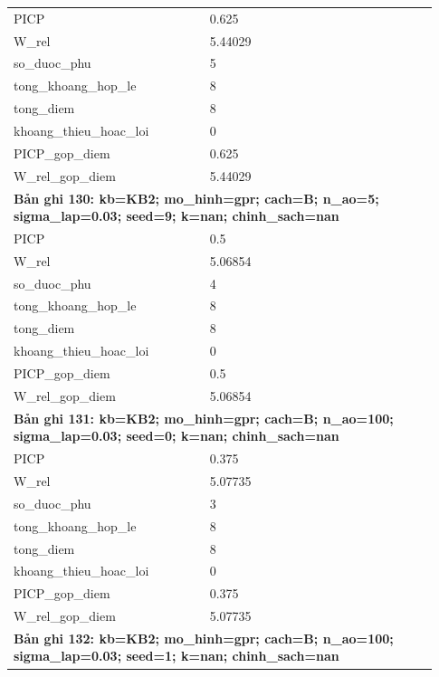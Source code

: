 \begin{longtable}{p{0.43\linewidth}p{0.50\linewidth}}
PICP & 0.625 \\
W\_\allowbreak rel & 5.44029 \\
so\_\allowbreak duoc\_\allowbreak phu & 5 \\
tong\_\allowbreak khoang\_\allowbreak hop\_\allowbreak le & 8 \\
tong\_\allowbreak diem & 8 \\
khoang\_\allowbreak thieu\_\allowbreak hoac\_\allowbreak loi & 0 \\
PICP\_\allowbreak gop\_\allowbreak diem & 0.625 \\
W\_\allowbreak rel\_\allowbreak gop\_\allowbreak diem & 5.44029 \\
\midrule
\multicolumn{2}{p{0.95\linewidth}}{\textbf{Bản ghi 130: kb=KB2; mo\_hinh=gpr; cach=B; n\_ao=5; sigma\_lap=0.03; seed=9; k=nan; chinh\_sach=nan}} \\
PICP & 0.5 \\
W\_\allowbreak rel & 5.06854 \\
so\_\allowbreak duoc\_\allowbreak phu & 4 \\
tong\_\allowbreak khoang\_\allowbreak hop\_\allowbreak le & 8 \\
tong\_\allowbreak diem & 8 \\
khoang\_\allowbreak thieu\_\allowbreak hoac\_\allowbreak loi & 0 \\
PICP\_\allowbreak gop\_\allowbreak diem & 0.5 \\
W\_\allowbreak rel\_\allowbreak gop\_\allowbreak diem & 5.06854 \\
\midrule
\multicolumn{2}{p{0.95\linewidth}}{\textbf{Bản ghi 131: kb=KB2; mo\_hinh=gpr; cach=B; n\_ao=100; sigma\_lap=0.03; seed=0; k=nan; chinh\_sach=nan}} \\
PICP & 0.375 \\
W\_\allowbreak rel & 5.07735 \\
so\_\allowbreak duoc\_\allowbreak phu & 3 \\
tong\_\allowbreak khoang\_\allowbreak hop\_\allowbreak le & 8 \\
tong\_\allowbreak diem & 8 \\
khoang\_\allowbreak thieu\_\allowbreak hoac\_\allowbreak loi & 0 \\
PICP\_\allowbreak gop\_\allowbreak diem & 0.375 \\
W\_\allowbreak rel\_\allowbreak gop\_\allowbreak diem & 5.07735 \\
\midrule
\multicolumn{2}{p{0.95\linewidth}}{\textbf{Bản ghi 132: kb=KB2; mo\_hinh=gpr; cach=B; n\_ao=100; sigma\_lap=0.03; seed=1; k=nan; chinh\_sach=nan}} \\

\end{longtable}
